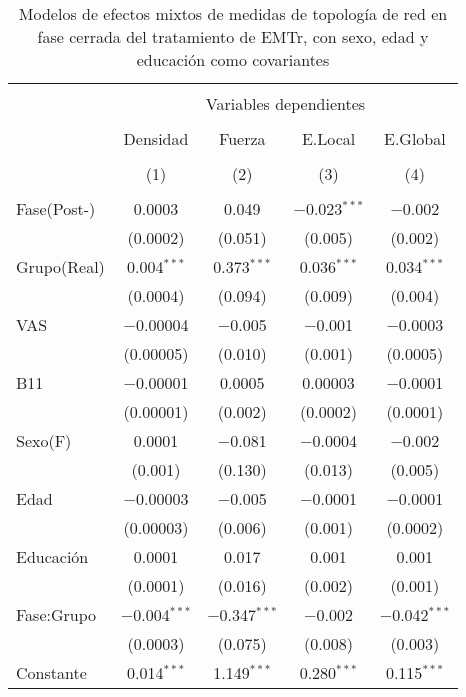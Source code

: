 \begin{table}[!htb] \centering
  \small
  \caption{Modelos de efectos mixtos de medidas de topología de red en fase cerrada del tratamiento de EMTr, con sexo, edad y educación como covariantes}
  \label{tab:memT1}
\begin{tabular}{@{\extracolsep{5pt}}lcccc}
\\[-1.8ex]\hline
\hline \\[-1.8ex]
 & \multicolumn{4}{c}{Variables dependientes} \\
\cline{2-5}
\\[-1.8ex] & Densidad & Fuerza & E.Local & E.Global \\
\\[-1.8ex] & (1) & (2) & (3) & (4)\\
\hline \\[-1.8ex]
 Fase(Post-) & 0.0003 & 0.049 & $-$0.023$^{***}$ & $-$0.002 \\
  & (0.0002) & (0.051) & (0.005) & (0.002) \\
  Grupo(Real) & 0.004$^{***}$ & 0.373$^{***}$ & 0.036$^{***}$ & 0.034$^{***}$ \\
  & (0.0004) & (0.094) & (0.009) & (0.004) \\
  VAS & $-$0.00004 & $-$0.005 & $-$0.001 & $-$0.0003 \\
  & (0.00005) & (0.010) & (0.001) & (0.0005) \\
  B11 & $-$0.00001 & 0.0005 & 0.00003 & $-$0.0001 \\
  & (0.00001) & (0.002) & (0.0002) & (0.0001) \\
  Sexo(F) & 0.0001 & $-$0.081 & $-$0.0004 & $-$0.002 \\
  & (0.001) & (0.130) & (0.013) & (0.005) \\
  Edad & $-$0.00003 & $-$0.005 & $-$0.0001 & $-$0.0001 \\
  & (0.00003) & (0.006) & (0.001) & (0.0002) \\
  Educación & 0.0001 & 0.017 & 0.001 & 0.001 \\
  & (0.0001) & (0.016) & (0.002) & (0.001) \\
  Fase:Grupo & $-$0.004$^{***}$ & $-$0.347$^{***}$ & $-$0.002 & $-$0.042$^{***}$ \\
  & (0.0003) & (0.075) & (0.008) & (0.003) \\
  Constante & 0.014$^{***}$ & 1.149$^{***}$ & 0.280$^{***}$ & 0.115$^{***}$ \\

\end{tabular}
\end{table}
